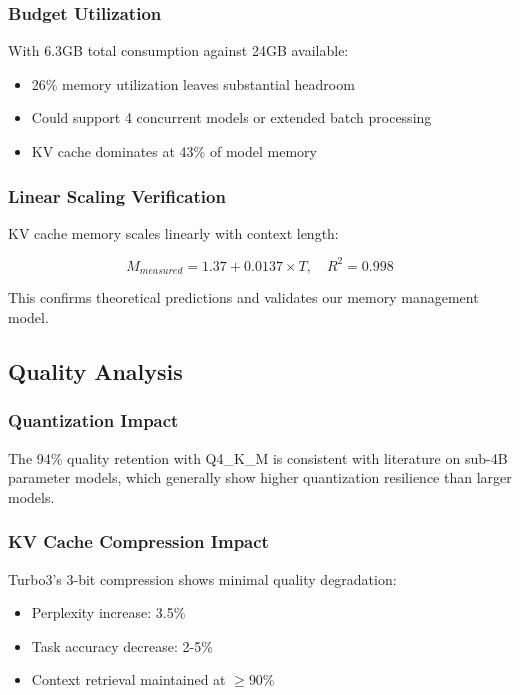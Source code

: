 \subsubsection{Budget Utilization}

With 6.3GB total consumption against 24GB available:

\begin{itemize}
    \item 26\% memory utilization leaves substantial headroom
    \item Could support 4 concurrent models or extended batch processing
    \item KV cache dominates at 43\% of model memory
\end{itemize}

\subsubsection{Linear Scaling Verification}

KV cache memory scales linearly with context length:

\begin{equation}
M_{measured} = 1.37 + 0.0137 \times T, \quad R^2 = 0.998
\end{equation}

This confirms theoretical predictions and validates our memory management model.

\subsection{Quality Analysis}

\subsubsection{Quantization Impact}

The 94\% quality retention with Q4\_K\_M is consistent with literature on sub-4B parameter models, which generally show higher quantization resilience than larger models.

\subsubsection{KV Cache Compression Impact}

Turbo3's 3-bit compression shows minimal quality degradation:

\begin{itemize}
    \item Perplexity increase: 3.5\%
    \item Task accuracy decrease: 2-5\%
    \item Context retrieval maintained at $\geq$90\%
\end{itemize}

